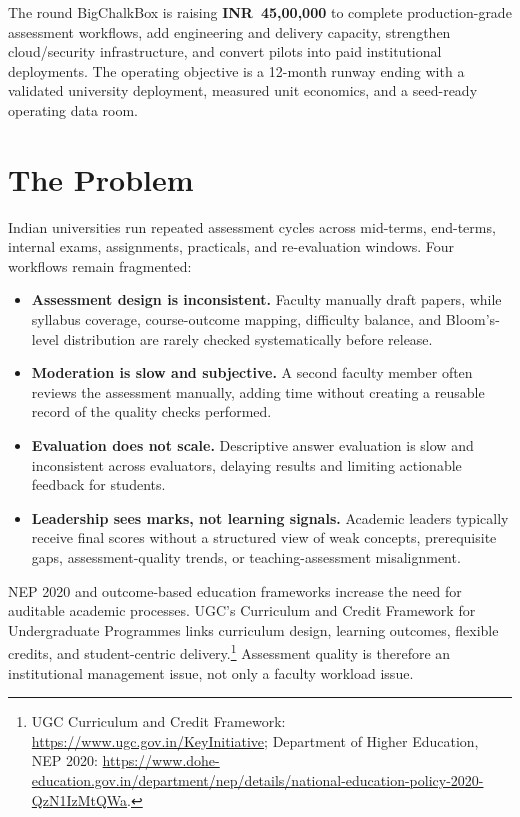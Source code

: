 \documentclass[11pt,a4paper]{article}
\newcommand{\rs}{INR}
\begin{document}
\begin{callout}{The round}
BigChalkBox is raising \textbf{\rs\ 45,00,000} to complete production-grade assessment workflows, add engineering and delivery capacity, strengthen cloud/security infrastructure, and convert pilots into paid institutional deployments. The operating objective is a 12-month runway ending with a validated university deployment, measured unit economics, and a seed-ready operating data room.
\end{callout}

\section{The Problem}

Indian universities run repeated assessment cycles across mid-terms, end-terms, internal exams, assignments, practicals, and re-evaluation windows. Four workflows remain fragmented:

\begin{itemize}
  \item \textbf{Assessment design is inconsistent.} Faculty manually draft papers, while syllabus coverage, course-outcome mapping, difficulty balance, and Bloom's-level distribution are rarely checked systematically before release.
  \item \textbf{Moderation is slow and subjective.} A second faculty member often reviews the assessment manually, adding time without creating a reusable record of the quality checks performed.
  \item \textbf{Evaluation does not scale.} Descriptive answer evaluation is slow and inconsistent across evaluators, delaying results and limiting actionable feedback for students.
  \item \textbf{Leadership sees marks, not learning signals.} Academic leaders typically receive final scores without a structured view of weak concepts, prerequisite gaps, assessment-quality trends, or teaching-assessment misalignment.
\end{itemize}

NEP 2020 and outcome-based education frameworks increase the need for auditable academic processes. UGC's Curriculum and Credit Framework for Undergraduate Programmes links curriculum design, learning outcomes, flexible credits, and student-centric delivery.\footnote{UGC Curriculum and Credit Framework: \url{https://www.ugc.gov.in/KeyInitiative}; Department of Higher Education, NEP 2020: \url{https://www.dohe-education.gov.in/department/nep/details/national-education-policy-2020-QzN1IzMtQWa}.} Assessment quality is therefore an institutional management issue, not only a faculty workload issue.
\end{document}
